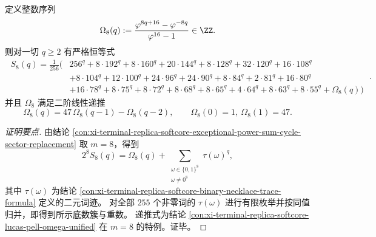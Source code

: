 \begin{conclusion}\label{con:xi-terminal-replica-softcore-exceptional-power-sum-m8}
定义整数序列
\[
\Omega_8(q):=\frac{\varphi^{8q+16}-\varphi^{-8q}}{\varphi^{16}-1}\in\ZZ.
\]
则对一切 \(q\ge 2\) 有严格恒等式
\[
\boxed{\;
\begin{aligned}
S_8(q)=\frac1{256}\Big(
&256^{q}+8\cdot 192^{q}+8\cdot 160^{q}+20\cdot 144^{q}+8\cdot 128^{q}+32\cdot 120^{q}+16\cdot 108^{q}\\
&+8\cdot 104^{q}+12\cdot 100^{q}+24\cdot 96^{q}+24\cdot 90^{q}+8\cdot 84^{q}+2\cdot 81^{q}+16\cdot 80^{q}\\
&+16\cdot 78^{q}+8\cdot 75^{q}+8\cdot 72^{q}+8\cdot 68^{q}+8\cdot 65^{q}+4\cdot 64^{q}+8\cdot 63^{q}+8\cdot 55^{q}
+\Omega_8(q)\Big)
\end{aligned}\; } .
\]
并且 \(\Omega_8\) 满足二阶线性递推
\[
\Omega_8(q)=47\,\Omega_8(q-1)-\Omega_8(q-2),\qquad \Omega_8(0)=1,\ \Omega_8(1)=47.
\]
\end{conclusion}
\begin{proof}[证明要点]
由结论 \ref{con:xi-terminal-replica-softcore-exceptional-power-sum-cycle-sector-replacement} 取 \(m=8\)，得到
\[
2^8S_8(q)=\Omega_8(q)+\sum_{\substack{\omega\in\{0,1\}^8\\ \omega\neq 0^8}}\tau(\omega)^{q},
\]
其中 \(\tau(\omega)\) 为结论 \ref{con:xi-terminal-replica-softcore-binary-necklace-trace-formula} 定义的二元词迹。
对全部 \(255\) 个非零词的 \(\tau(\omega)\) 进行有限枚举并按同值归并，即得到所示底数簇与重数。
递推式为结论 \ref{con:xi-terminal-replica-softcore-lucas-pell-omega-unified} 在 \(m=8\) 的特例。证毕。
\end{proof}

\endinput

